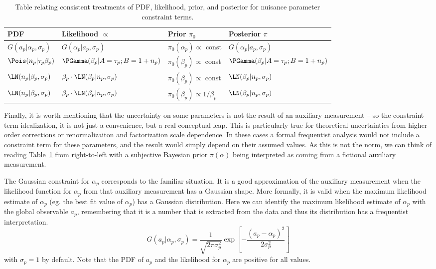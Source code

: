 \begin{table}
\center
\begin{tabular}{llll}
PDF & Likelihood $\propto$ & Prior $\pi_0$ & Posterior $\pi$ \\ \hline
$G(a_p | \alpha_p, \sigma_p)$ & $G(\alpha_p | a_p, \sigma_p)$ & $\pi_0(\alpha_p)\propto$  const & $G(\alpha_p | a_p, \sigma_p)$ \\
$\Pois(n_p | \tau_p \beta_p)$ & $\PGamma(\beta_p | A=\tau_p; B=1+n_p)$ & $\pi_0(\beta_p) \propto$  const & $\PGamma(\beta_p | A=\tau_p; B=1+n_p)$ \\
$\LN(n_p | \beta_p, \sigma_p)$ & $ \beta_p  \cdot \LN(\beta_p | n_p, \sigma_p)$ & $\pi_0(\beta_p) \propto $ const & $\LN(\beta_p | n_p, \sigma_p)$ \\
$\LN(n_p | \beta_p, \sigma_p)$ & $\beta_p  \cdot\LN(\beta_p | n_p, \sigma_p)$ & $\pi_0(\beta_p) \propto 1/\beta_p $  & $\LN(\beta_p | n_p, \sigma_p)$\\
\end{tabular}
\caption{Table relating consistent treatments of PDF, likelihood, prior, and posterior for nuisance parameter constraint terms.}
\label{tab:constraints}
\end{table}


Finally, it is worth mentioning that the uncertainty on some parameters is not the result of an auxiliary measurement -- so the constraint term idealization, it is not just a convenience, but a real  conceptual leap.  This is particularly true for theoretical uncertainties from higher-order corrections or renormalizaiton and factorization scale dependence.  In these cases a formal frequentist analysis would not include a constraint term for these parameters, and the result would simply depend on their assumed values.  As this is not the norm, we can think of reading Table~\ref{tab:constraints} from right-to-left with a subjective Bayesian prior $\pi(\alpha)$ being interpreted as coming from a fictional auxiliary measurement.


The Gaussian constraint for $\alpha_p$ corresponds to the familiar situation.  It is a good approximation of the auxiliary measurement when the likelihood function for $\alpha_p$ from that auxiliary measurement has a Gaussian shape.  More formally, it is valid when the maximum likelihood estimate of $\alpha_p$ (eg. the best fit value of $\alpha_p$) has a Gaussian distribution.  Here we can identify the maximum likelihood estimate of $\alpha_p$ with the global observable $a_p$, remembering that it is a number that is extracted from the data and thus its distribution has a frequentist interpretation.  
\begin{equation}
G(a_p | \alpha_p, \sigma_p) = \frac{1}{\sqrt{2\pi \sigma_p^2}} \exp \left[ -\frac{(a_p - \alpha_p)^2}{2\sigma_p^2} \right]
\end{equation}
with $\sigma_p=1$ by default.
Note that the PDF of $a_p$ and the likelihood for $\alpha_p$ are positive for all values. 


